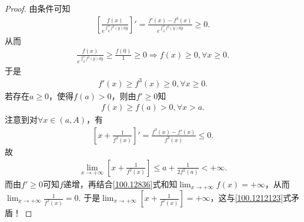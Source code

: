 \documentclass[../../main.tex]{subfiles}%
\begin{document}
\begin{proof}
由条件可知
\begin{align*}
\left[ \frac{f\left( x \right)}{e^{\int_0^x{f^2\left( y \right) \mathrm{d}y}}} \right]' =\frac{f' \left( x \right) -f^3\left( x \right)}{e^{\int_0^x{f^2\left( y \right) \mathrm{d}y}}}\geqslant 0.
\end{align*}
从而
\begin{align*}
\frac{f\left( x \right)}{e^{\int_0^x{f^2\left( y \right) \mathrm{d}y}}}\geqslant \frac{f\left( 0 \right)}{1}\geqslant 0\Longrightarrow f\left( x \right) \geqslant 0,\forall x\geqslant 0.
\end{align*}
于是
\begin{align*}
f' \left( x \right) \geqslant f^3\left( x \right) \geqslant 0,\forall x\geqslant 0.
\end{align*}
若存在$a\geqslant 0$，使得$f\left( a \right) >0$，则由$f' \geqslant 0$知
\begin{align}
f\left( x \right) \geqslant f\left( a \right) >0,\forall x>a. \label{100.12836}
\end{align}
注意到对$\forall x\in \left( a,A \right)$，有
\begin{align*}
\left[ x+\frac{1}{f^2\left( x \right)} \right]' =\frac{f^3\left( x \right) -f' \left( x \right)}{f^3\left( x \right)}\leqslant 0.
\end{align*}
故
\begin{align}
\lim_{x\rightarrow +\infty}\left[ x+\frac{1}{f^2\left( x \right)} \right] \leqslant a+\frac{1}{2f^2\left( a \right)}<+\infty . \label{100.1212123}
\end{align}
而由$f' \geqslant 0$可知$f$递增，再结合\eqref{100.12836}式和知$\lim_{x\rightarrow +\infty} f\left( x \right) =+\infty $，从而$\lim_{x\rightarrow +\infty}\frac{1}{f^2\left( x \right)}=0 .$
于是$\lim_{x\rightarrow +\infty}\left[ x+\frac{1}{f^2\left( x \right)} \right] =+\infty$，这与\eqref{100.1212123}式矛盾！
\end{proof}
\end{document}
